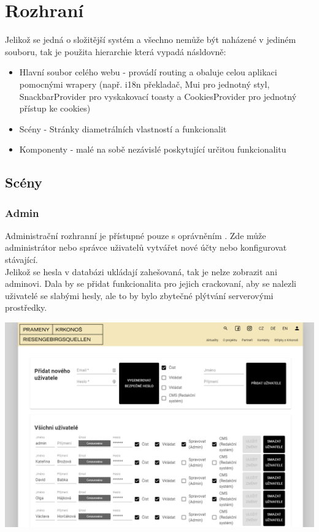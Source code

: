 \section{Rozhraní}
Jelikož se jedná o složitější systém a všechno nemůže být naházené v jediném souboru, tak 
je použita hierarchie která vypadá násldovně:
\begin{itemize}
	\item Hlavní soubor celého webu - provádí routing a obaluje celou aplikaci pomocnými wrapery
		(např. i18n překladač, Mui pro jednotný styl, SnackbarProvider
		pro vyskakovací toasty a CookiesProvider pro jednotný přístup ke cookies)
	\item Scény - Stránky diametrálních vlastností a funkcionalit
	\item Komponenty - malé na sobě nezávislé  poskytující určitou funkcionalitu
\end{itemize}


\subsection{Scény}
\subsubsection{Admin}
Administrační rozhranní je přístupné pouze s oprávněním .
Zde může administrátor nebo správce uživatelů vytvářet nové účty nebo
konfigurovat stávající.\\
Jelikož se hesla v databázi ukládají zahešovaná, tak je nelze zobrazit ani adminovi.
Dala by se přidat funkcionalita pro jejich crackovaní, aby se nalezli uživatelé se
slabými hesly, ale to by bylo zbytečné plýtvání serverovými prostředky.
\begin{center}
	\includegraphics[width=.8\textwidth]{img/adminScene.png}
\end{center}

